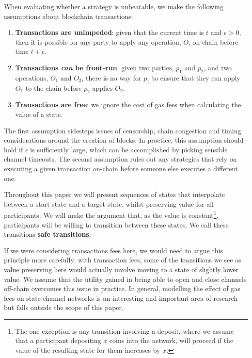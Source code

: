 \documentclass{article}
\begin{document}
When evaluating whether a strategy is unbeatable, we make the following assumptions about blockchain transactions:
\begin{enumerate}
  \item \textbf{Transactions are unimpeded}: given that the current time is $t$ and $\epsilon > 0$, then it is possible for any party to apply any operation, $O$, on-chain before time $t + \epsilon$.
  \item \textbf{Transactions \textit{can} be front-run}: given two parties, $p_1$ and $p_2$, and two operations, $O_1$ and $O_2$, there is no way for $p_1$ to ensure that they can apply $O_1$ to the chain before $p_2$ applies $O_2$.
  \item \textbf{Transactions are free}: we ignore the cost of gas fees when calculating the value of a state.
\end{enumerate}
The first assumption sidesteps issues of censorship, chain congestion and timing considerations around the creation of blocks.
In practice, this assumption should hold if $\epsilon$ is sufficiently large, which can be accomplished by picking sensible channel timeouts.
The second assumption rules out any strategies that rely on executing a given transaction on-chain before someone else executes a different one.

Throughout this paper we will present sequences of states that interpolate between a start state and a target state, whilst preserving value for all participants.
We will make the argument that, as the value is constant\footnote{
The one exception is any transition involving a deposit, where we assume that a participant depositing
$x$ coins into the network, will proceed if the value of the resulting state for them increases by $x$.
}, participants will be willing to transition between these states.
We call these transitions \textbf{safe transitions}.

If we were considering transactions fees here, we would need to argue this principle more
carefully: with transaction fees, some of the transitions we see as value preserving here
would actually involve moving to a state of slightly lower value. 
We assume that the utility gained in being able to open and close channels off-chain overcomes
this issue in practice.
In general, modelling the effect of gas fees on state channel networks is an interesting and important area of research but falls outside the scope of this paper.
\end{document}
